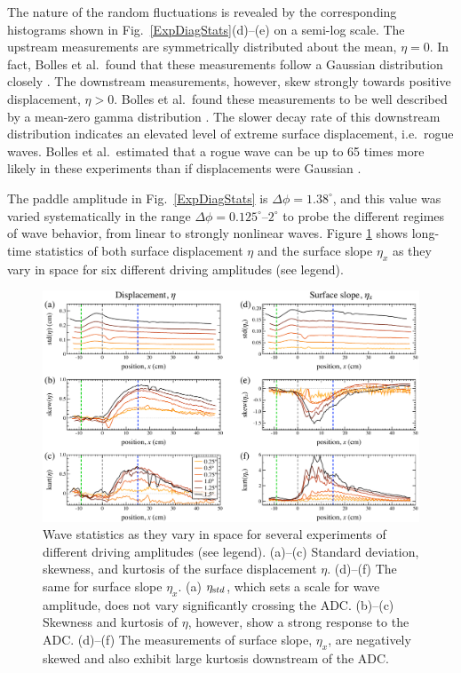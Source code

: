 \documentclass[11pt]{article}
\newcommand{\etastd}{\eta_{\text std}}
\newcommand{\Dphi}{\Delta \phi}
\begin{document}
	The nature of the random fluctuations is revealed by the corresponding histograms shown in Fig.~\ref{ExpDiagStats}(d)--(e) on a semi-log scale. The upstream measurements are symmetrically distributed about the mean, $\eta = 0$. In fact, Bolles et al.~found that these measurements follow a Gaussian distribution closely \cite{bolles2019}. The downstream measurements, however, skew strongly towards positive displacement, $\eta > 0$. Bolles et al.~found these measurements to be well described by a mean-zero gamma distribution \cite{bolles2019}. The slower decay rate of this downstream distribution indicates an elevated level of extreme surface displacement, i.e.~rogue waves. Bolles et al.~estimated that a rogue wave can be up to 65 times more likely in these experiments than if displacements were Gaussian \cite{bolles2019}. 
 
	The paddle amplitude in Fig.~\ref{ExpDiagStats} is $\Dphi = 1.38^{\circ}$, and this value was varied systematically in the range $\Dphi = 0.125^{\circ}$--$2^{\circ}$ to probe the different regimes of wave behavior, from linear to strongly nonlinear waves. Figure \ref{ExpSpatialStats} shows long-time statistics of both surface displacement $\eta$ and the surface slope $\eta_x$ as they vary in space for six different driving amplitudes (see legend). 
 
\begin{figure}%
\begin{center}
\includegraphics[width = 0.8 \linewidth]{Figs/ExpSpatialStats.pdf}
\caption{Wave statistics as they vary in space for several experiments of different driving amplitudes (see legend). (a)--(c) Standard deviation, skewness, and kurtosis of the surface displacement $\eta$. (d)--(f) The same for surface slope $\eta_x$. (a) $\etastd$, which sets a scale for wave amplitude, does not vary significantly crossing the ADC. (b)--(c) Skewness and kurtosis of $\eta$, however, show a strong response to the ADC. (d)--(f) The measurements of surface slope, $\eta_x$, are negatively skewed and also exhibit large kurtosis downstream of the ADC. }
\label{ExpSpatialStats}
\end{center}
\end{figure}
 
\end{document}
